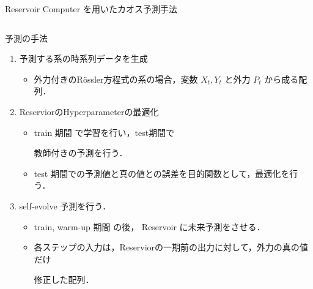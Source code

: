   \begin{frame}{Reservoir Computer を用いたカオス予測手法}
    \begin{columns}[T] %
    
        \begin{column}{.5\textwidth}
        \vspace{-.35cm}
        \begin{block}{予測の手法}
          \begin{enumerate}
            \item 予測する系の時系列データを生成\begin{itemize}
              \item 外力付きのRössler方程式の系の場合，変数 $X_t, Y_t$ と外力 $P_t$ から成る配列．
            \end{itemize}
            \item ReserviorのHyperparameterの最適化\begin{itemize}
              \item train 期間 で学習を行い，test期間で
              
              教師付きの予測を行う．
              \item test 期間での予測値と真の値との誤差を目的関数として，最適化を行う．
            \end{itemize}
            \item self-evolve 予測を行う．\begin{itemize}
              \item train, warm-up 期間 の後，
              Reservoir に未来予測をさせる．
              \item 各ステップの入力は，Reserviorの一期前の出力に対して，外力の真の値だけ
              
              修正した配列．
            \end{itemize}
        \end{enumerate}
        \end{block}
        \end{column}
    

\end{columns}
\end{frame}
